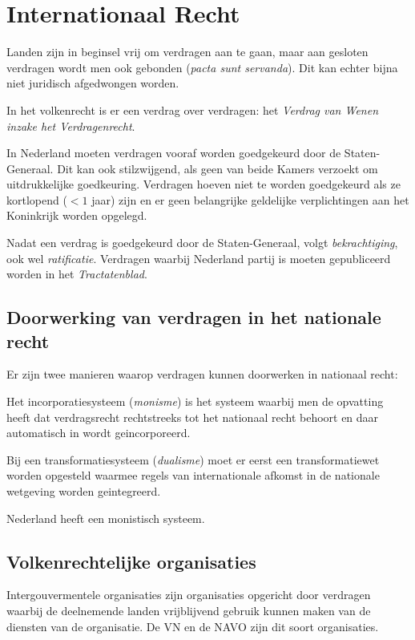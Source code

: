 \documentclass{article}
\begin{document}
\section{Internationaal Recht} \label{h15}

Landen zijn in beginsel vrij om verdragen aan te gaan, maar aan gesloten
verdragen wordt men ook gebonden (\emph{pacta sunt servanda}). Dit kan echter
bijna niet juridisch afgedwongen worden.

In het volkenrecht is er een verdrag over verdragen: het \emph{Verdrag van
Wenen inzake het Verdragenrecht}.

In Nederland moeten verdragen vooraf worden goedgekeurd door de
Staten-Generaal. Dit kan ook stilzwijgend, als geen van beide Kamers verzoekt
om uitdrukkelijke goedkeuring. Verdragen hoeven niet te worden goedgekeurd als
ze kortlopend ($<1$ jaar) zijn en er geen belangrijke geldelijke verplichtingen
aan het Koninkrijk worden opgelegd.

Nadat een verdrag is goedgekeurd door de Staten-Generaal, volgt
\emph{bekrachtiging}, ook wel \emph{ratificatie}. Verdragen waarbij Nederland
partij is moeten gepubliceerd worden in het \emph{Tractatenblad}.

\subsection{Doorwerking van verdragen in het nationale recht}

Er zijn twee manieren waarop verdragen kunnen doorwerken in nationaal recht:

Het incorporatiesysteem (\emph{monisme}) is het systeem waarbij men de opvatting
heeft dat verdragsrecht rechtstreeks tot het nationaal recht behoort en daar
automatisch in wordt geincorporeerd.

Bij een transformatiesysteem (\emph{dualisme}) moet er eerst een transformatiewet
worden opgesteld waarmee regels van internationale afkomst in de nationale wetgeving
worden geintegreerd.

Nederland heeft een monistisch systeem.

\subsection{Volkenrechtelijke organisaties}

Intergouvermentele organisaties zijn organisaties opgericht door verdragen waarbij
de deelnemende landen vrijblijvend gebruik kunnen maken van de diensten van de
organisatie. De VN en de NAVO zijn dit soort organisaties.
\end{document}
